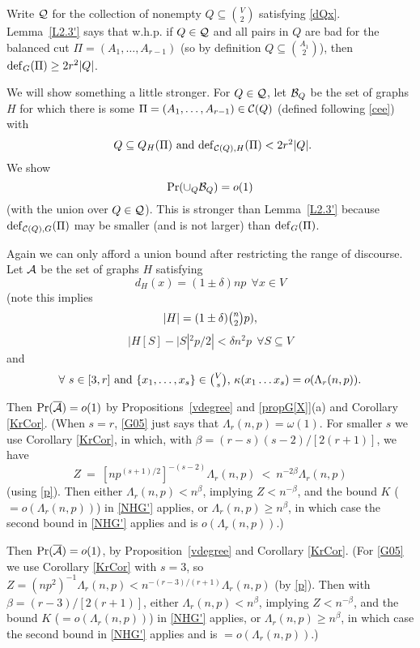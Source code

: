 \documentclass[letterpaper,11pt]{article}
\newcommand{\beq}[1]{\begin{equation}\label{#1}}
\newcommand{\enq}[0]{\end{equation}}
\newcommand{\mn}[0]{\medskip\noindent}
\newcommand{\sub}[0]{\subseteq}
\renewcommand{\dots}[0]{,\ldots,}
\newcommand{\ov}[0]{\overline}
\newcommand{\A}[0]{{\cal A}}
\newcommand{\B}[0]{{\cal B}}
\newcommand{\cee}[0]{{\cal C}}
\newcommand{\Q}[0]{{\cal Q}}
\newcommand{\deff}[0]{{\rm def}}
\newcommand{\0}[0]{\emptyset}
\newcommand{\C}[2]{{{#1}\choose{{#2}}}}
\newcommand{\Cc}[0]{\tbinom}
\newcommand{\gb}[0]{\beta }
\newcommand{\gd}[0]{\delta }
\newcommand{\gL}[0]{\Lambda}
\newcommand{\go}[0]{\omega}
\newcommand{\glr}[0]{\gL_r(n,p)}
\begin{document}
Write $\Q$ for the collection of nonempty $Q\sub \C{V}{2}$
satisfying \eqref{dQx}.
%
Lemma~\ref{L2.3'} says that w.h.p.
if $Q\in \Q$ and all pairs in $Q$
are bad for the balanced cut $\Pi=(A_1\dots A_{r-1})$
(so by definition $Q\sub \C{A_1}{2}$), then
$\deff_G(\Pi)\geq 2r^2 |Q|$.

We will show something a little stronger.
For $Q\in \Q$, let $\B_Q$ be the set of graphs $H$
for which there is some
$\Pi=(A_1\dots A_{r-1})\in \cee(Q)$
(defined following \eqref{cee}) with
\beq{QQPi}
\mbox{
$Q\sub Q_H(\Pi)$ and
$\deff_{\cee(Q),H}(\Pi)< 2r^2|Q|$.}
\enq
We show
\beq{UQBQ}
\Pr(\cup_Q\B_Q) =o(1)
\enq
(with the union over $Q\in \Q$).
This is stronger than Lemma~\ref{L2.3'} because
$\deff_{\cee(Q),G}(\Pi)$ may be smaller (and is not larger)
than $\deff_G(\Pi)$.

\medskip
Again we can only afford a union bound after restricting
the range of discourse.
Let
$\A$ be the set of graphs $H$
satisfying
\beq{G01}
d_H(x) =(1\pm \gd)np ~~\forall x\in V
\enq
(note this implies
\beq{G01'}
|H| = (1\pm \gd)\Cc{n}{2}p),
\enq
\beq{G04}
|H[S]-|S|^2p/2| < \gd n^2p ~~\forall S\sub V
\enq
and
\beq{G05}
\mbox{$\forall$ $s\in [3,r]$ and
$\{x_1\dots x_s\}\in \Cc{V}{s}$,
$\kappa(x_1\ldots x_s)=o(\gL_r(n,p))$.}
\enq



\mn
Then $\Pr(\ov{\A})=o(1)$ by Propositions~\ref{vdegree}
and \ref{propG[X]}(a)
and Corollary \ref{KrCor}.
(When $s=r$, \eqref{G05} just says that $\glr=\go(1)$.
For smaller $s$ we use Corollary \ref{KrCor}, in which,
with $\gb =(r-s)(s-2)/[2(r+1)]$,
we have
\[
Z~=~ [np^{(s+1)/2}]^{-(s-2)}\glr~<~ n^{-2\gb}\glr
\]
(using \eqref{p}).
Then either $\glr< n^\gb$, implying $Z<n^{-\gb}$,
and the bound $K$ ($=o(\glr)$) in
\eqref{NHG'} applies, or $\glr\geq n^\gb$, in which case the second
bound in \eqref{NHG'} applies and is $o(\glr)$.)


\iffalse

\mn
Then $\Pr(\ov{\A})=o(1)$, by Proposition~\ref{vdegree}
and Corollary \ref{KrCor}.
(For \eqref{G05} we use Corollary \ref{KrCor} with $s=3$,
so $Z= (np^2)^{-1}\glr< n^{-(r-3)/(r+1)}\glr$
(by \eqref{p}).  Then with $\gb =(r-3)/[2(r+1)]$,
either $\glr< n^\gb$, implying $Z<n^{-\gb}$,
and the bound $K$ ($=o(\glr)$) in
\eqref{NHG'} applies, or $\glr\geq n^\gb$, in which case the second
bound in \eqref{NHG'} applies and is $=o(\glr)$.)
\end{document}

